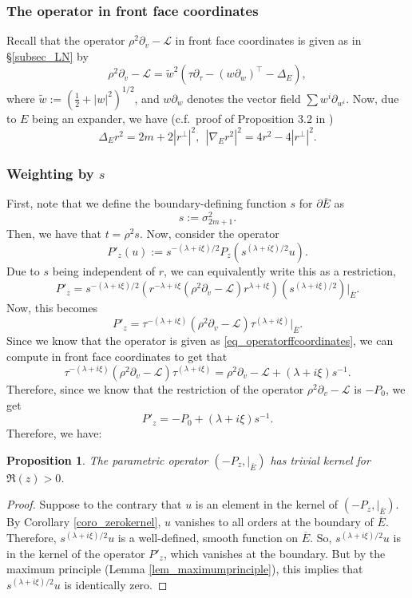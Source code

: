 \documentclass[10pt, a4paper]{article}
\theoremstyle{plain}%
\newtheorem{prop}[theorem]{Proposition}
\theoremstyle{definition}
\numberwithin{figure}{section}
\numberwithin{equation}{section}
\newcommand{\pa}{\partial}
\newcommand{\cL}{\mathcal{L}}
\newcommand{\oE}{{\overline{E}}}
\newcommand{\tw}{\tilde{w}}
\begin{document}
 \subsubsection{The operator in front face coordinates}
 Recall that the operator $\rho^2\pa_v-\cL$ in front face coordinates is given as in \S \ref{subsec_LN} by
 \begin{equation}\label{eq_operatorffcoordinates}
 	\rho^2\pa_v-\cL = \tw^2(\tau\pa_\tau - (w\pa_w)^\top -\Delta_E),
 \end{equation}
 where $\tw := (\frac{1}{2}+|w|^2)^{1/2}$, and $w\pa_w$ denotes the vector field $\sum w^i\pa_{w^i}$. Now, due to $E$ being an expander, we have (c.f.\ proof of Proposition 3.2 in \cite{LN13}) \[
 \Delta_E r^2 = 2m + 2|r^\perp|^2 , \: \: |\nabla_E r^2|^2=4r^2-4|r^\perp|^2.
 \]
 


\subsubsection{Weighting by $s$}



First, note that we define the boundary-defining function $s$ for $\pa\oE$ as \[
s:=\sigma_{2m+1}^2.
\]
Then, we have that $t=\rho^2s$. Now, consider the operator \[
P'_z(u) := s^{-(\lambda+i\xi)/2}P_z(s^{(\lambda+i\xi)/2}u).
\]
Due to $s$ being independent of $r$, we can equivalently write this as a restriction, \[
P'_z  = s^{-(\lambda+i\xi)/2}(r^{-\lambda+i\xi}(\rho^2\pa_v-\cL)r^{\lambda+i\xi})(s^{(\lambda+i\xi)/2})|_{\oE}.
\]
Now, this becomes \[
P'_z = \tau^{-(\lambda+i\xi)}(\rho^2\pa_v-\cL)\tau^{(\lambda+i\xi)}|_{\oE}.
\]
Since we know that the operator is given as \eqref{eq_operatorffcoordinates}, we can compute in front face coordinates to get that \[
\tau^{-(\lambda+i\xi)}(\rho^2\pa_v-\cL)\tau^{(\lambda+i\xi)} = \rho^2\pa_v-\cL + (\lambda+i\xi)s^{-1}.
\]
Therefore, since we know that the restriction of the operator $\rho^2\pa_v-\cL$ is $-P_0$, we get \[
P'_z = -P_0 + (\lambda+i\xi)s^{-1}.  
\]
 Therefore, we have:
\begin{prop}\label{prop_nozerokernel}
The parametric operator $(-P_z,|_\oE)$ has trivial kernel for $\Re(z)>0$.	
\end{prop}
\begin{proof}
	Suppose to the contrary that $u$ is an element in the kernel of $(-P_z,|_{\oE})$. By Corollary \ref{coro_zerokernel}, $u$ vanishes to all orders at the boundary of $\oE$. Therefore, $s^{(\lambda+i\xi)/2}u$ is a well-defined, smooth function on $\oE$. So, $s^{(\lambda+i\xi)/2}u$ is in the kernel of the operator $P'_z$, which vanishes at the boundary. But by the maximum principle (Lemma \ref{lem_maximumprinciple}), this implies that $s^{(\lambda+i\xi)/2}u$ is identically zero.
\end{proof}
\end{document}

